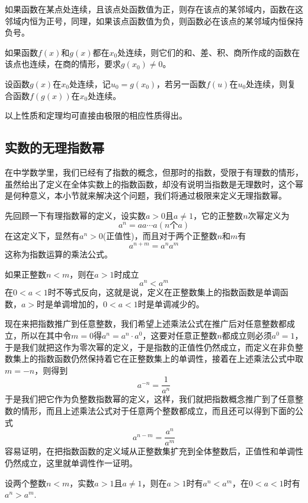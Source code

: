 \begin{inference}
  如果函数在某点处连续，且该点处函数值为正，则存在该点的某邻域内，函数在这邻域内恒为正号，同理，如果该点函数值为负，则函数必在该点的某邻域内恒保持负号。
\end{inference}

\begin{theorem}
  如果函数$f(x)$和$g(x)$都在$x_0$处连续，则它们的和、差、积、商所作成的函数在该点也连续，在商的情形，要求$g(x_0) \neq 0$。
\end{theorem}

\begin{theorem}[复合函数的连续性]
  设函数$g(x)$在$x_0$处连续，记$u_0=g(x_0)$，若另一函数$f(u)$在$u_0$处连续，则复合函数$f(g(x))$在$x_0$处连续。
\end{theorem}

以上性质和定理均可直接由极限的相应性质得出。

\subsection{实数的无理指数幂}
\label{sec:the-power-of-real-with-rational-exponent}

在中学数学里，我们已经有了指数的概念，但那时的指数，受限于有理数的情形，虽然给出了定义在全体实数上的指数函数，却没有说明当指数是无理数时，这个幂是何种意义，本小节就来解决这个问题，我们将通过极限来定义无理指数幂。

先回顾一下有理指数幂的定义，设实数$a>0$且$a \neq 1$，它的正整数$n$次幂定义为
\[ a^n = aa\cdots a(n\text{个}a) \]
在这定义下，显然有$a^n>0$(正值性)，而且对于两个正整数$n$和$m$有
\begin{equation}
  \label{eq:exponent-multiple-rule-with-positive-integer}
  a^{n+m}=a^na^m
\end{equation}
这称为指数运算的乘法公式。

如果正整数$n<m$，则在$a>1$时成立
\[ a^n<a^m \]
在$0<a<1$时不等式反向，这就是说，定义在正整数集上的指数函数是单调函数，$a>$时是单调增加的，$0<a<1$时是单调减少的。

现在来把指数推广到任意整数，我们希望上述乘法公式在推广后对任意整数都成立，所以在其中令$m=0$得$a^n=a^n \cdot a^0$，这要对任意正整数$n$都成立则必须$a^0=1$，于是我们就把这作为零次幂的定义，于是指数的正值性仍然成立，而定义在非负整数集上的指数函数仍然保持着它在正整数集上的单调性，接着在上述乘法公式中取$m=-n$，则得到
\[ a^{-n} = \frac{1}{a^n} \]
于是我们把它作为负整数指数幂的定义，这样，我们就把指数概念推广到了任意整数的情形，而且上述乘法公式对于任意两个整数都成立，而且还可以得到下面的公式
\[ a^{n-m} = \frac{a^n}{a^m} \]
容易证明，在把指数函数的定义域从正整数集扩充到全体整数后，正值性和单调性仍然成立，这里就单调性作一证明。
\begin{theorem}
  设两个整数$n<m$，实数$a>1$且$a \neq 1$，则在$a>1$时有$a^n<a^m$，在$0<a<1$时有$a^n>a^m$.
\end{theorem}

